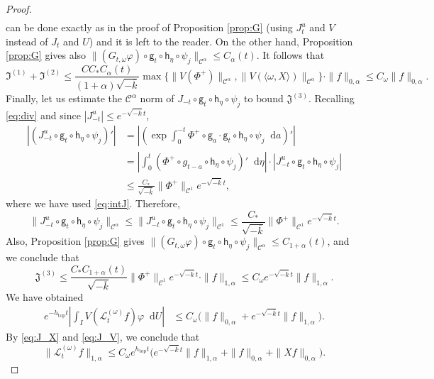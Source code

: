 \documentclass[11pt,letterpaper]{amsart}
\newcommand \cL {{\mathcal L}}
\newcommand \cC {{\mathscr{C}}}
\newcommand{\horo}{\mathsf{h}}
\newcommand{\geo}{\mathsf{g}}
\newcommand*{\diff}{\mathop{}\!\mathrm{d}}
\DeclareMathOperator{\topp}{top}
\theoremstyle{definition}
\begin{document}
\begin{proof}
\[\begin{split}
\end{split}
\]
can be done exactly as in the proof of Proposition \ref{prop:G} (using $J^u_t$ and $V$ instead of $J_t$ and $U$) and it is left to the reader. On the other hand, Proposition \ref{prop:G} gives also $\|(G_{t,\omega}\varphi)\circ \geo_t\circ \horo_\eta\circ \psi_j\|_{\cC^\alpha}\le C_\alpha(t).$
It follows that
\[
\mathfrak I^{(1)}+\mathfrak I^{(2)} \le \frac{C C_* C_\alpha(t)}{(1+\alpha) \sqrt{-\overline k}}\max\{\|V(\Phi^+)\|_{\cC^\alpha}, \|V(\langle \omega, X \rangle)\|_{\cC^\alpha}\}\cdot \|f\|_{0,\alpha}\le C_\omega \|f\|_{0,\alpha}.
\]
Finally, let us estimate the $\cC^\alpha$ norm of $J_{-t}\circ \geo_t\circ \horo_\eta \circ \psi_j$ to bound $\mathfrak J^{(3)}$. Recalling \eqref{eq:div} and since $|J^u_{-t}|\le e^{-\sqrt{-\overline k}t}$,
\[
\begin{split}
|(J^u_{-t}\circ \geo_t\circ \horo_\eta \circ \psi_j)' |&=\left| \left(\exp\int_0^{-t} \Phi^+\circ \geo_a\cdot \geo_t\circ \horo_\eta\circ \psi_j \diff a \right)'  \right|\\
%
&=\left| \int_0^t(\Phi^+\circ g_{t-a}\circ \horo_\eta\circ \psi_j)' \diff \eta  \right| \cdot |J^u_{-t}\circ \geo_t\circ \horo_\eta \circ \psi_j|\\
%
&\le \frac{C_*}{\sqrt{-\overline k}}\|\Phi^+\|_{\cC^1} e^{-\sqrt{-\overline k}t},
\end{split}
\]
where we have used \eqref{eq:intJ}. Therefore,
\[
\|J^u_{-t}\circ \geo_t\circ \horo_\eta \circ \psi_j\|_{\cC^\alpha}\le \|J^u_{-t}\circ \geo_t\circ \horo_\eta \circ \psi_j\|_{\cC^1}\le \frac{C_*}{\sqrt{-\overline k}}\|\Phi^+\|_{\cC^1} e^{-\sqrt{-\overline k}t}.
\]
Also, Proposition \ref{prop:G} gives $\|(G_{t,\omega}\varphi)\circ \geo_t\circ \horo_\eta\circ \psi_j\|_{\cC^\alpha}\le C_{1+\alpha}(t)$, and we conclude that
\[
\mathfrak J^{(3)}\le  \frac{C_* C_{1+\alpha}(t)}{\sqrt{-\overline k}}\|\Phi^+\|_{\cC^1} e^{-\sqrt{-\overline k}t}\cdot \|f\|_{1,\alpha}\le C_\omega e^{-\sqrt{-\overline k}t}  \|f\|_{1,\alpha}.
\]
We have obtained 
\begin{equation}\label{eq:J_V}
\begin{split}
e^{-h_{\topp}t}\left| \int_{I} V(\cL^{(\omega)}_tf)\varphi \diff U \right| &\le C_{\omega}\big( \|f\|_{0,\alpha}+e^{-\sqrt{-\overline k}t}\|f\|_{1,\alpha}\big).
\end{split}
\end{equation}
By \eqref{eq:J_X} and \eqref{eq:J_V}, we conclude that 
\[
\|\cL^{(\omega)}_t f\|_{1,\alpha} \le C_\omega e^{h_{\topp}t} \big(e^{-\sqrt{-\overline k}t} \|f\|_{1,\alpha} +\|f\|_{0,\alpha}+\|Xf\|_{0,\alpha}\big).
\]
\end{proof}
\end{document}
